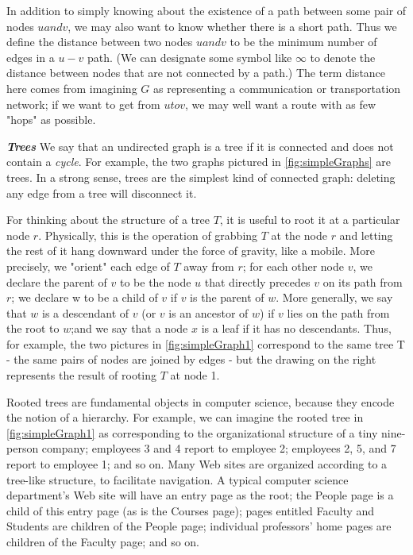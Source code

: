 \documentclass[12pt,a4paper]{book}
\begin{document}
In addition to simply knowing about the existence of a path between some pair of nodes $u and v$, we may also want to know whether there is a short path. Thus we define the distance between two nodes $u and v$ to be the minimum number of edges in a $u-v$ path. (We can designate some symbol like $\infty$ to denote the distance between nodes that are not connected by a path.) The term distance here comes from imagining $G$ as representing a communication or transportation network; if we want to get from $u to v$, we may well want a route with as few "hops" as possible.\par
\textbf{\textit{Trees}} We say that an undirected graph is a tree if it is connected and does not contain a \textit{cycle}. For example, the two graphs pictured in \ref{fig:simpleGraphs} are trees. In a strong sense, trees are the simplest kind of connected graph: deleting any edge from a tree will disconnect it.\par 
For thinking about the structure of a tree $T$, it is useful to root it at a particular node $r$. Physically, this is the operation of grabbing $T$ at the node $r$ and letting the rest of it hang downward under the force of gravity, like a mobile. More precisely, we "orient" each edge of $T$ away from $r$; for each other node $v$, we declare the parent of $v$ to be the node $u$ that directly precedes $v$ on its path from $r$; we declare w to be a child of $v$ if $v$ is the parent of $w$. More generally, we say that $w$ is a descendant of $v$ (or $v$ is an ancestor of $w$) if $v$ lies on the path from the root to $w$;and we say that a node $x$ is a leaf if it has no descendants. Thus, for example, the two pictures in \ref{fig:simpleGraph1} correspond to the same tree T - the same pairs of nodes are joined by edges - but the drawing on the right represents the result of rooting $T$ at node 1.\par
Rooted trees are fundamental objects in computer science, because they encode the notion of a hierarchy. For example, we can imagine the rooted tree in \ref{fig:simpleGraph1}  as corresponding to the organizational structure of a tiny nine-person company; employees 3 and 4 report to employee 2; employees 2, 5, and 7 report to employee 1; and so on. Many Web sites are organized according to a tree-like structure, to facilitate navigation. A typical computer science department's Web site will have an entry page as the root; the People page is a child of this entry page (as is the Courses page); pages entitled Faculty and Students are children of the People page; individual professors' home pages are children of the Faculty page; and so on.\par
\end{document}
